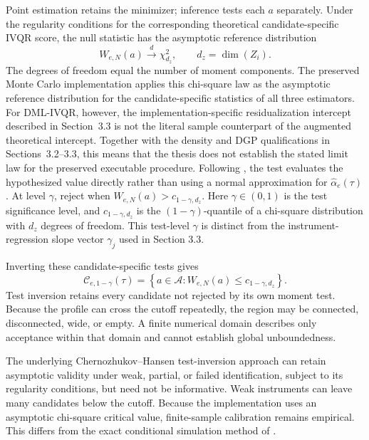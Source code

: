 Point estimation retains the minimizer; inference tests each $a$ separately. Under the regularity conditions for the corresponding theoretical candidate-specific IVQR score, the null statistic has the asymptotic reference distribution
\begin{equation}
    W_{e,N}(a)
    \overset{d}{\longrightarrow}
    \chi^2_{d_z},
    \qquad d_z=\dim(Z_i).
    \label{eq:weak-id-null-distribution}
\end{equation}
The degrees of freedom equal the number of moment components. The preserved Monte Carlo implementation applies this chi-square law as the asymptotic reference distribution for the candidate-specific statistics of all three estimators. For DML-IVQR, however, the implementation-specific residualization intercept described in Section~3.3 is not the literal sample counterpart of the augmented theoretical intercept. Together with the density and DGP qualifications in Sections~3.2--3.3, this means that the thesis does not establish the stated limit law for the preserved executable procedure. Following \textcite{chernozhukov_hansen_2008}, the test evaluates the hypothesized value directly rather than using a normal approximation for $\widehat\alpha_e(\tau)$. At level $\gamma$, reject when $W_{e,N}(a)>c_{1-\gamma,d_z}$. Here $\gamma\in(0,1)$ is the test significance level, and $c_{1-\gamma,d_z}$ is the $(1-\gamma)$-quantile of a chi-square distribution with $d_z$ degrees of freedom. This test-level $\gamma$ is distinct from the instrument-regression slope vector $\gamma_j$ used in Section 3.3.

Inverting these candidate-specific tests gives
\begin{equation}
    \mathcal C_{e,1-\gamma}(\tau)
    =
    \left\{
        a\in\mathcal A:
        W_{e,N}(a)\leq c_{1-\gamma,d_z}
    \right\}.
    \label{eq:robust-confidence-region}
\end{equation}
Test inversion retains every candidate not rejected by its own moment test. Because the profile can cross the cutoff repeatedly, the region may be connected, disconnected, wide, or empty. A finite numerical domain describes only acceptance within that domain and cannot establish global unboundedness.

The underlying Chernozhukov--Hansen test-inversion approach can retain asymptotic validity under weak, partial, or failed identification, subject to its regularity conditions, but need not be informative. Weak instruments can leave many candidates below the cutoff. Because the implementation uses an asymptotic chi-square critical value, finite-sample calibration remains empirical. This differs from the exact conditional simulation method of \textcite{chernozhukov_hansen_jansson_2009}.

